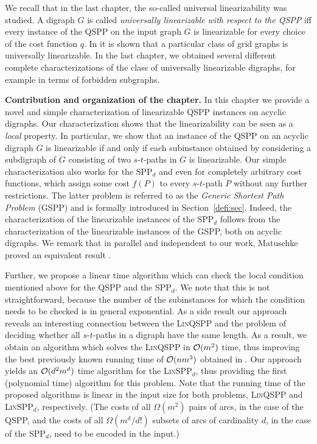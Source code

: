    We recall that in the last chapter, the  so-called universal linearizability was studied.
A digraph $G$ is called \emph{universally linearizable with respect to the
  QSPP} iff every instance of the QSPP on the input graph $G$ is linearizable for
every choice of the cost function $q$. In \cite{huSo2018} it is shown that a
particular class of grid graphs is universally linearizable. In
the last chapter, we obtained several different complete characterizations of the class of universally linearizable digraphs, for example in terms of 
forbidden subgraphs.  
\medskip

\textbf{Contribution and organization of the chapter.}
In this chapter we provide a novel and simple characterization of linearizable QSPP instances on acyclic 
digraphs.
Our characterization shows that the linearizability can be seen as a  \emph{local} property.  In particular, we show  that an instance of the QSPP on an acyclic 
digraph $G$  is linearizable if and only if each subinstance obtained by considering a subdigraph of $G$ consisting of two $s$-$t$-paths in $G$   is linearizable. Our simple characterization also works for the SPP$_d$  and even for completely arbitrary cost  functions, which  assign some cost $f(P)$ to every $s$-$t$-path $P$ without any further restrictions. The latter problem is referred to as the \emph{Generic Shortest Path Problem} (GSPP) and is formally introduced in Section~\ref{defi:sec}. Indeed, the characterization of the linearizable instances of the SPP$_d$ 
follows from the characterization of the linearizable instances of the GSPP, both on acyclic digraphs. We remark that in parallel and independent to our work, Matuschke proved an equivalent result \cite[Theorem 6]{matuschke2023decomposition}.

Further,  we propose  a 
linear time algorithm
which can check the local condition mentioned above   for the QSPP and the SPP$_d$. 
We note that this is not straightforward, because the number of the subinstances for which the condition needs to be checked is in general exponential. As a side result our approach reveals  an interesting connection between the \textsc{Lin}QSPP and the problem of deciding  whether all $s$-$t$-paths in a digraph have the same length.
As a result, we obtain an algorithm which solves the \textsc{Lin}QSPP  in $\mathcal{O}(m^2)$ time, thus improving the best previously known running time of $\mathcal{O}(nm^3)$ obtained in \cite{huSo2021}. Our approach yields an $\mathcal{O}(d^2 m^d)$ time algorithm for the \textsc{Lin}SPP$_d$, thus providing  the first (polynomial time) algorithm for this problem.  Note that the running time of the proposed algorithms is linear in the input size for both problems,  \textsc{Lin}QSPP and \textsc{Lin}SPP$_d$, respectively. 
(The costs of all $\Omega(m^2)$ pairs of arcs, in the case of the QSPP, and the  costs of all $\Omega(m^d/d!)$ subsets of  arcs of cardinality $d$, in the case of the
SPP$_d$,  need to be encoded in the input.) 



